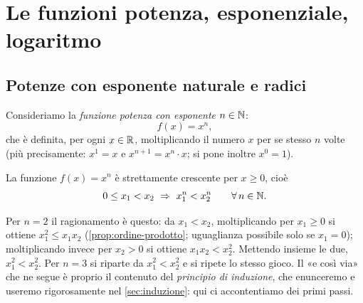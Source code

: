 \section{Le funzioni potenza, esponenziale, logaritmo}
\label{sec:potenze}

\subsection{Potenze con esponente naturale e radici}

Consideriamo la \emph{funzione potenza con esponente $n\in\mathbb{N}$}:
\begin{equation}\label{eq:potenza-n}
  f(x)=x^{n},
\end{equation}
che è definita, per ogni $x\in\mathbb{R}$, moltiplicando il numero $x$ per se stesso $n$ volte
(più precisamente: $x^{1}=x$ e $x^{n+1}=x^{n}\cdot x$; si pone inoltre $x^{0}=1$).

\begin{proposizione}\label{prop:potenza-crescente}
La funzione $f(x)=x^{n}$ è strettamente crescente per $x\ge0$, cioè
\begin{equation}\label{eq:potenza-crescente}
  0\le x_{1}<x_{2} \ \Rightarrow\ x_{1}^{n}<x_{2}^{n} \qquad\forall\, n\in\mathbb{N}.
\end{equation}
\end{proposizione}

\begin{schema}
\end{schema}

\begin{strategia}
Per $n=2$ il ragionamento è questo: da $x_{1}<x_{2}$, moltiplicando per $x_{1}\ge0$ si
ottiene $x_{1}^{2}\le x_{1}x_{2}$ (\cref{prop:ordine-prodotto}; uguaglianza possibile
solo se $x_{1}=0$); moltiplicando invece per $x_{2}>0$ si ottiene $x_{1}x_{2}<x_{2}^{2}$.
Mettendo insieme le due, $x_{1}^{2}<x_{2}^{2}$. Per $n=3$ si riparte da
$x_{1}^{2}<x_{2}^{2}$ e si ripete lo stesso gioco. Il «e così via» che ne segue è
proprio il contenuto del \emph{principio di induzione}, che enunceremo e useremo
rigorosamente nel \cref{sec:induzione}: qui ci accontentiamo dei primi passi.
\end{strategia}

